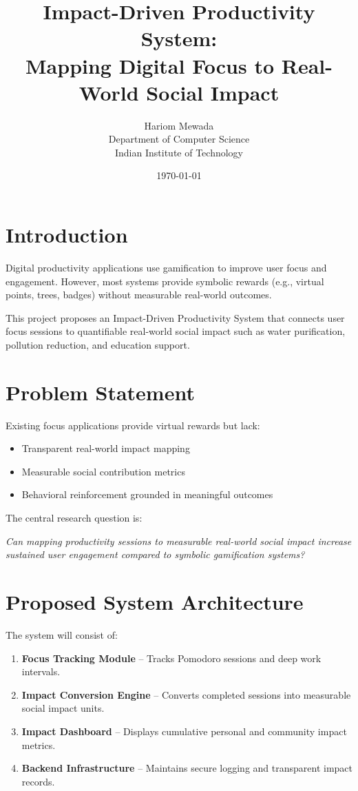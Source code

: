 \documentclass[12pt]{article}
\title{\textbf{Impact-Driven Productivity System:\\
Mapping Digital Focus to Real-World Social Impact}}
\author{Hariom Mewada \\
Department of Computer Science \\
Indian Institute of Technology}
\date{\today}
\begin{document}
\maketitle

\section{Introduction}

Digital productivity applications use gamification to improve user focus and engagement. 
However, most systems provide symbolic rewards (e.g., virtual points, trees, badges) 
without measurable real-world outcomes.

This project proposes an Impact-Driven Productivity System that connects user focus 
sessions to quantifiable real-world social impact such as water purification, 
pollution reduction, and education support.

\section{Problem Statement}

Existing focus applications provide virtual rewards but lack:
\begin{itemize}
    \item Transparent real-world impact mapping
    \item Measurable social contribution metrics
    \item Behavioral reinforcement grounded in meaningful outcomes
\end{itemize}

The central research question is:

\textit{Can mapping productivity sessions to measurable real-world social impact 
increase sustained user engagement compared to symbolic gamification systems?}

\section{Proposed System Architecture}

The system will consist of:

\begin{enumerate}
    \item \textbf{Focus Tracking Module} – Tracks Pomodoro sessions and deep work intervals.
    \item \textbf{Impact Conversion Engine} – Converts completed sessions into measurable social impact units.
    \item \textbf{Impact Dashboard} – Displays cumulative personal and community impact metrics.
    \item \textbf{Backend Infrastructure} – Maintains secure logging and transparent impact records.
\end{enumerate}
\end{document}
